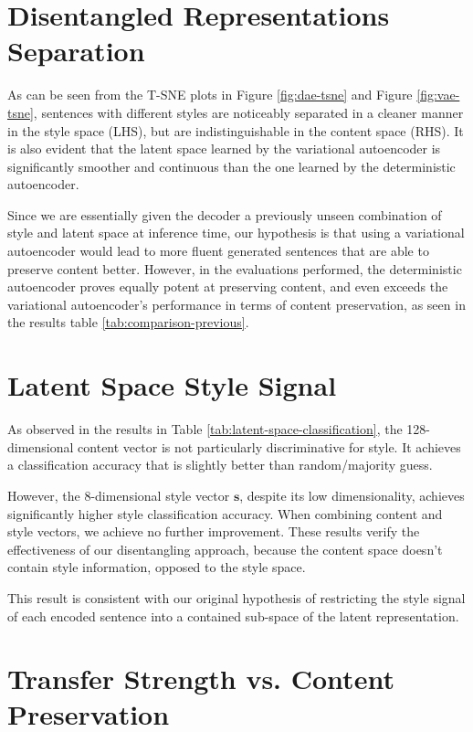 \section{Disentangled Representations Separation}

As can be seen from the T-SNE plots in Figure \ref{fig:dae-tsne} and Figure \ref{fig:vae-tsne}, sentences with different styles are noticeably separated in a cleaner manner in the style space (LHS), but are indistinguishable in the content space (RHS). It is also evident that the latent space learned by the variational autoencoder is significantly smoother and continuous than the one learned by the deterministic autoencoder.

Since we are essentially given the decoder a previously unseen combination of style and latent space at inference time, our hypothesis is that using a variational autoencoder would lead to more fluent generated sentences that are able to preserve content better. However, in the evaluations performed, the deterministic autoencoder proves equally potent at preserving content, and even exceeds the variational autoencoder's performance in terms of content preservation, as seen in the results table \ref{tab:comparison-previous}.


\section{Latent Space Style Signal}

As observed in the results in Table \ref{tab:latent-space-classification}, the 128-dimensional content vector is not particularly discriminative for style. It achieves a classification accuracy that is slightly better than random/majority guess.

However, the 8-dimensional style vector $\bm s$, despite its low dimensionality, achieves significantly higher style classification accuracy. When combining content and style vectors, we achieve no further improvement. These results verify the effectiveness of our disentangling approach, because the content space doesn't contain style information, opposed to the style space.

This result is consistent with our original hypothesis of restricting the style signal of each encoded sentence into a contained sub-space of the latent representation.


\section{Transfer Strength vs. Content Preservation}

